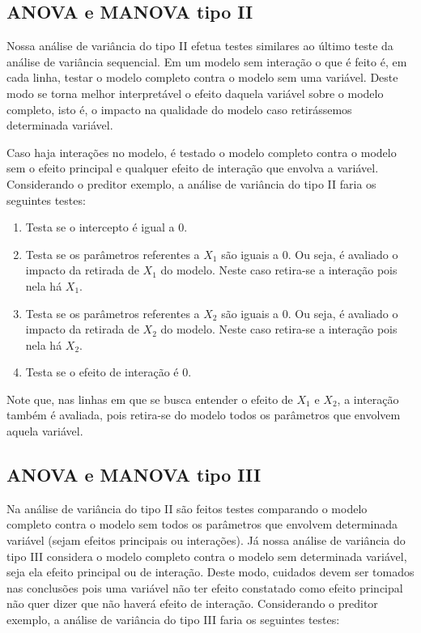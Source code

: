 \subsection{ANOVA e MANOVA tipo II}

Nossa análise de variância do tipo II efetua testes similares ao último teste da análise de variância sequencial. Em um modelo sem interação o que é feito é, em cada linha, testar o modelo completo contra o modelo sem uma variável. Deste modo se torna melhor interpretável o efeito daquela variável sobre o modelo completo, isto é, o impacto na qualidade do modelo caso retirássemos determinada variável.

Caso haja interações no modelo, é testado o modelo completo contra o modelo sem o efeito principal e qualquer efeito de interação que envolva a variável. Considerando o preditor exemplo, a análise de variância do tipo II faria os seguintes testes:

\begin{enumerate}
  \item Testa se o intercepto é igual a 0.
  
  \item Testa se os parâmetros referentes a $X_1$ são iguais a 0. Ou seja, é avaliado o impacto da retirada de $X_1$ do modelo. Neste caso retira-se a interação pois nela há $X_1$.
  
  \item Testa se os parâmetros referentes a $X_2$ são iguais a 0. Ou seja, é avaliado o impacto da retirada de $X_2$ do modelo. Neste caso retira-se a interação pois nela há $X_2$.
  
  \item Testa se o efeito de interação é 0.

\end{enumerate}

Note que, nas linhas em que se busca entender o efeito de $X_1$ e $X_2$, a interação também é avaliada, pois retira-se do modelo todos os parâmetros que envolvem aquela variável.

\subsection{ANOVA e MANOVA tipo III}

Na análise de variância do tipo II são feitos testes comparando o modelo completo contra o modelo sem todos os parâmetros que envolvem determinada variável (sejam efeitos principais ou interações). Já nossa análise de variância do tipo III considera o modelo completo contra o modelo sem determinada variável, seja ela efeito principal ou de interação. Deste modo, cuidados devem ser tomados nas conclusões pois uma variável não ter efeito constatado como efeito principal não quer dizer que não haverá efeito de interação. Considerando o preditor exemplo, a análise de variância do tipo III faria os seguintes testes:

